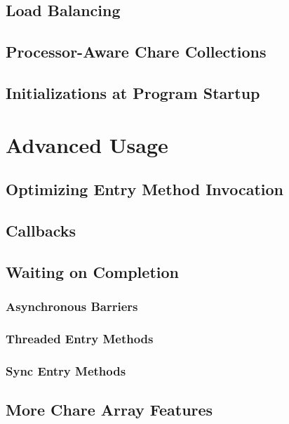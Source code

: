 \documentclass[10pt]{report}
\begin{document}
\chapter{Load Balancing}
  

\chapter{Processor-Aware Chare Collections}
  
  

\chapter{Initializations at Program Startup}
  

\part{Advanced Usage}

\chapter{Optimizing Entry Method Invocation}
  
  
  

\chapter{Callbacks}
  

\chapter{Waiting on Completion}
  \section{Asynchronous Barriers}
  \section{Threaded Entry Methods}
  \section{Sync Entry Methods}
  
  

\chapter{More Chare Array Features}
\label{advanced arrays}
  
\end{document}
